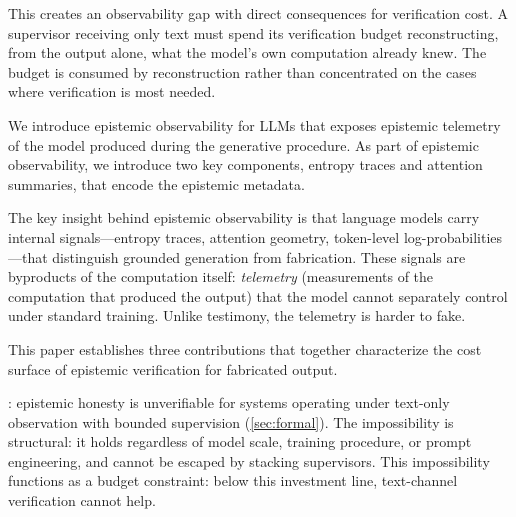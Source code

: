 This creates an observability gap with direct consequences for
verification cost. A supervisor receiving only text must spend its
verification budget reconstructing, from the output alone,
what the model's own computation already knew. The budget is
consumed by reconstruction rather than concentrated on the cases
where verification is most needed.

We introduce epistemic observability for LLMs that exposes epistemic
telemetry of the model produced during the generative procedure.
As part of epistemic observability, we introduce two key components, entropy traces
and attention summaries, that encode the epistemic metadata.

The key insight behind epistemic observability is that language models carry internal
signals---entropy traces, attention geometry, token-level
log-probabilities---that distinguish grounded generation from
fabrication. These signals are byproducts of the computation itself:
\emph{telemetry} (measurements of the computation that produced the output)
that the model cannot separately control under standard training. 
Unlike testimony, the telemetry is harder to fake. 


This paper establishes three contributions that together characterize the cost
surface of epistemic verification for fabricated output.

: epistemic honesty is unverifiable for
systems operating under text-only observation with bounded supervision
(\autoref{sec:formal}). 
The impossibility is structural: it holds regardless
of model scale, training procedure, or prompt engineering, and
cannot be escaped by stacking supervisors.
This impossibility functions as a budget constraint: below this
investment line, text-channel verification cannot help.

